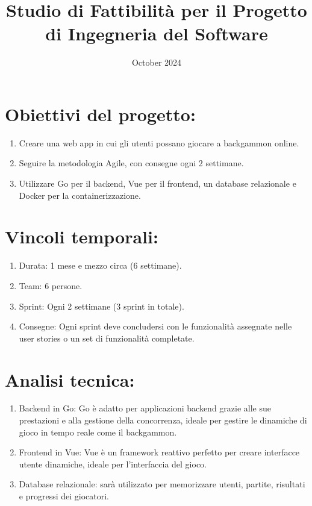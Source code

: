 \documentclass{article}
\title{Studio di Fattibilità per il Progetto di Ingegneria del Software}
\date{October 2024}
\begin{document}
\maketitle

\section{Obiettivi del progetto:}

\begin{enumerate}
    \item    Creare una web app in cui gli utenti possano giocare a backgammon online.
    \item    Seguire la metodologia Agile, con consegne ogni 2 settimane.
    \item    Utilizzare Go per il backend, Vue per il frontend, un database 
      relazionale e Docker per la containerizzazione.
\end{enumerate}

\section{Vincoli temporali:}

\begin{enumerate}
    \item   Durata: 1 mese e mezzo circa (6 settimane).
    \item   Team: 6 persone.
    \item   Sprint: Ogni 2 settimane (3 sprint in totale).
    \item   Consegne: Ogni sprint deve concludersi con le funzionalità assegnate 
      nelle user stories o un set di funzionalità completate.
\end{enumerate}

\section{Analisi tecnica:}

\begin{enumerate}
    \item Backend in Go: Go è adatto per applicazioni backend grazie alle sue 
      prestazioni e alla gestione della concorrenza, ideale per gestire le 
      dinamiche di gioco in tempo reale come il backgammon.
      
    \item Frontend in Vue: Vue è un framework reattivo perfetto per creare 
      interfacce utente dinamiche, ideale per l'interfaccia del gioco.

    \item Database relazionale: sarà utilizzato per memorizzare utenti, partite, 
      risultati e progressi dei giocatori.
\end{enumerate}
\end{document}
